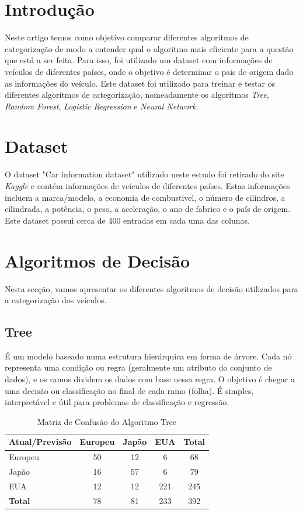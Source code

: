 \documentclass[conference]{IEEEtran}
\begin{document}
\section{Introdução}
Neste artigo temos como objetivo comparar diferentes algoritmos de categorização de modo a entender qual o algoritmo mais eficiente para
a questão que está a ser feita. Para isso, foi utilizado um dataset com informações de veículos de diferentes países, onde o objetivo é
determinar o pais de origem dado as informações do veículo. Este dataset foi utilizado para treinar e testar os diferentes algoritmos de
categorização, nomeadamente os algoritmos \textit{Tree}, \textit{Random Forest}, \textit{Logistic Regression} e \textit{Neural Network}.

\section{Dataset}
O dataset "Car information dataset" \cite{ref1} utilizado neste estudo foi retirado do site \textit{Kaggle} e contém informações de 
veículos de diferentes países. Estas informações incluem a marca/modelo, a economia de combustivel, o número de cilindros, a cilindrada, 
a potência, o peso, a aceleração, o ano de fabrico e o país de origem. Este dataset possui cerca de 400 entradas em cada uma das colunas.

\section{Algoritmos de Decisão}
Nesta secção, vamos apresentar os diferentes algoritmos de decisão utilizados para a categorização dos veículos.

\subsection{Tree}
É um modelo baseado numa estrutura hierárquica em forma de árvore. Cada nó representa uma condição ou regra 
(geralmente um atributo do conjunto de dados), e os ramos dividem os dados com base nessa regra. O objetivo 
é chegar a uma decisão ou classificação no final de cada ramo (folha). É simples, interpretável e útil para 
problemas de classificação e regressão.
\begin{table}[!ht]
    \centering
    \begin{tabular}{lcccc}
    \toprule
    \textbf{Atual/Previsão} & \textbf{Europeu} & \textbf{Japão} & \textbf{EUA} & \textbf{Total} \\
    \midrule
    Europeu & 50 & 12 & 6 & 68 \\
    Japão  & 16 & 57 & 6 & 79 \\
    EUA    & 12 & 12 & 221 & 245 \\
    \midrule
    \textbf{Total} & 78 & 81 & 233 & 392 \\
    \bottomrule
    \end{tabular}
    \label{tab:conf_matrix_tree}
    \caption{Matriz de Confusão do Algoritmo Tree}
\end{table}
\end{document}

